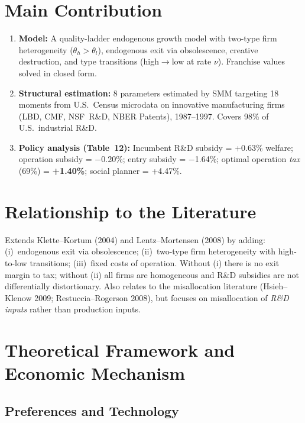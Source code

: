 \section{Main Contribution}

\begin{enumerate}
  \item \textbf{Model:} A quality-ladder endogenous growth model with two-type
    firm heterogeneity ($\theta_h > \theta_l$), endogenous exit via
    obsolescence, creative destruction, and type transitions
    (high$\to$low at rate $\nu$). Franchise values solved in closed form.

  \item \textbf{Structural estimation:} 8 parameters estimated by SMM
    targeting 18 moments from U.S.\ Census microdata on innovative
    manufacturing firms (LBD, CMF, NSF~R\&D, NBER Patents), 1987--1997.
    Covers 98\% of U.S.\ industrial R\&D.

  \item \textbf{Policy analysis (Table~12):} Incumbent R\&D subsidy = +0.63\%
    welfare; operation subsidy = $-$0.20\%; entry subsidy = $-$1.64\%;
    optimal operation \emph{tax} (69\%) = \textbf{+1.40\%}; social planner = +4.47\%.
\end{enumerate}

\section{Relationship to the Literature}

Extends Klette--Kortum (2004) and Lentz--Mortensen (2008) by adding:
(i)~endogenous exit via obsolescence; (ii)~two-type firm heterogeneity with
high-to-low transitions; (iii)~fixed costs of operation. Without (i) there is
no exit margin to tax; without (ii) all firms are homogeneous and R\&D
subsidies are not differentially distortionary. Also relates to the
misallocation literature (Hsieh--Klenow 2009; Restuccia--Rogerson 2008),
but focuses on misallocation of \emph{R\&D inputs} rather than production
inputs.

\section{Theoretical Framework and Economic Mechanism}

\subsection*{Preferences and Technology}

